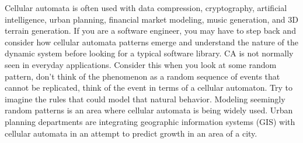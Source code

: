 Cellular automata is often used with data compression, cryptography, artificial
intelligence, urban planning, financial market modeling, music generation, and
3D terrain generation. If you are a software engineer, you may have to step back
and consider how cellular automata patterns emerge and understand the nature of
the dynamic system before looking for a typical software library. CA is not
normally seen in everyday applications. Consider this when you look at some
random pattern, don't think of the phenomenon as a random sequence of events
that cannot be replicated, think of the event in terms of a cellular automaton.
Try to imagine the rules that could model that natural behavior. Modeling
seemingly random patterns is an area where cellular automata is being widely
used. Urban planning departments are integrating geographic information systems
(GIS) with cellular automata in an attempt to predict growth in an area of a
city.
